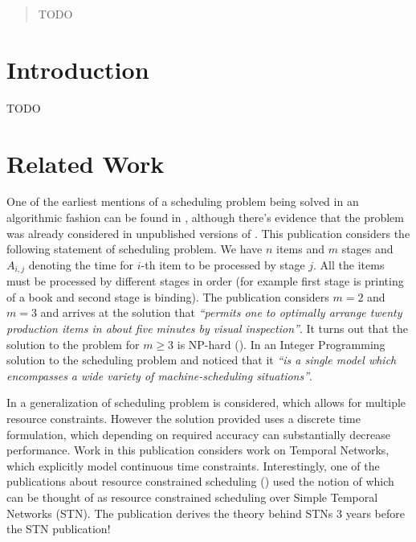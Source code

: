 \documentclass{article}
\begin{document}
\begin{multicols}{2}
\begin{abstract}
\noindent TODO
\end{abstract}
\section{Introduction}
TODO
\section{Related Work}

One of the earliest mentions of a scheduling problem being solved in an algorithmic fashion can be found in \cite{johnson1954optimal}, although there's evidence that the problem was already considered in unpublished versions of \cite{bellman1956mathematical}. This publication considers the following statement of scheduling problem. We have $n$ items and $m$ stages and $A_{i,j}$ denoting the time for $i$-th item to be processed by stage $j$. All the items must be processed by different stages in order (for example first stage is printing of a book and second stage is binding). The publication considers $m=2$ and $m=3$ and arrives at the solution that \textit{``permits one to optimally arrange twenty production items in about five minutes by visual inspection''}. It turns out that the solution to the problem for $m \geq 3$ is NP-hard (\cite{garey1976complexity}). In \cite{wagner1959integer} an Integer Programming solution to the scheduling problem and noticed that it \textit{``is a single model which encompasses a wide variety of machine-scheduling situations''}.

In \cite{pritsker1969multiproject} a generalization of scheduling problem is considered, which allows for multiple resource constraints. However the solution provided uses a discrete time formulation, which depending on required accuracy can substantially decrease performance. Work in this publication considers work on Temporal Networks, which explicitly model continuous time constraints. Interestingly, one of the publications about resource constrained scheduling (\cite{bartusch1988scheduling}) used the notion of which can be thought of as resource constrained scheduling over Simple Temporal Networks (STN). The publication derives the theory behind STNs 3 years before the STN publication!


\end{multicols}
\end{document}
